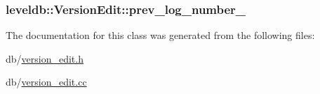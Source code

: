 \hypertarget{classleveldb_1_1_version_edit_ac8762934b27315cb0ba897c306412562}{
\subsubsection[{prev\-\_\-log\-\_\-number\-\_\-}]{ leveldb\-::\-Version\-Edit\-::prev\-\_\-log\-\_\-number\-\_\-\hspace{0.3cm}{\ttfamily [private]}}}\label{classleveldb_1_1_version_edit_ac8762934b27315cb0ba897c306412562}


The documentation for this class was generated from the following files\-:\begin{DoxyCompactItemize}
\item 
db/\hyperlink{version__edit_8h}{version\-\_\-edit.\-h}\item 
db/\hyperlink{version__edit_8cc}{version\-\_\-edit.\-cc}\end{DoxyCompactItemize}
